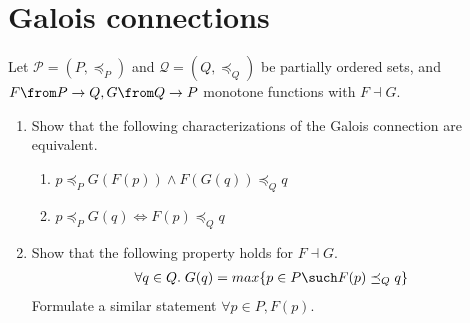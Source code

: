 \def\pathToRoot{../../}


	\author {Sarah Mameche}
	
	
	\section{Galois connections}
	
	\begin{exercise}
		Let $\mathscr{P} = (P, \preceq_P)$ and $\mathscr{Q} = (Q, \preceq_Q)$ be partially ordered sets, and $F \from P \to Q, G \from Q \to P$ monotone functions with $F \dashv G$.
		\begin{enumerate}
			\item Show that the following characterizations of the Galois connection are equivalent.
			\begin{enumerate}
				\item $p \preceq_P G (F (p)) \land F(G (q)) \preceq_Q q$
				\item $p \preceq_P G(q) \Leftrightarrow F(p) \preceq_Q q$
			\end{enumerate}
			\item Show that the following property holds for $F \dashv G$. 
			\[  
			\begin{aligned}
			\forall q \in Q.\; G(q) = max\{p \in P \such F(p) \preceq_Q q\}
			\end{aligned}
			\]
			Formulate a similar statement $ \forall p \in P, F(p)$.
		\end{enumerate}
	\end{exercise}
	
